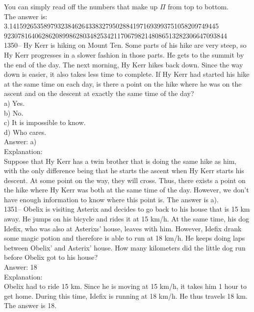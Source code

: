 \documentclass[letterpaper, 12pt]{article}
\begin{document}
You can simply read off the numbers that make up $\Pi$ from top to bottom.\\

The answer is:\\
3.1415926535897932384626433832795028841971693993751058209749445\\
92307816406286208998628034825342117067982148086513282306647093844\\

1350-- Hy Kerr is hiking on Mount Ten. Some parts of his hike are very steep, so Hy Kerr progresses in a slower fashion in those parts. He gets to the summit by the end of the day. The next morning, Hy Kerr hikes back down. Since the way down is easier, it also takes less time to complete. If Hy Kerr had started his hike at the same time on each day, is there a point on the hike where he was on the ascent and on the descent at exactly the same time of the day?\\
a) Yes.\\
b) No.\\
c) It is impossible to know.\\
d) Who cares.\\

Answer: a)\\

Explanation: \\
Suppose that Hy Kerr has a twin brother that is doing the same hike as him, with the only difference being that he starts the ascent when Hy Kerr starts his descent. At some point on the way, they will cross. Thus, there exists a point on the hike where Hy Kerr was both at the same time of the day. However, we don't have enough information to know where this point is. The answer is a).\\

1351-- Obelix is visiting Asterix and decides to go back to his house that is 15 km away. He jumps on his bicycle and rides it at 15 km/h. At the same time, his dog Idefix, who was also at Asterixs' house, leaves with him. However, Idefix drank some magic potion and therefore is able to run at 18 km/h. He keeps doing laps between Obelix' and Asterix' house. How many kilometers did the little dog run before Obelix got to his house?\\

Answer: 18\\

Explanation: \\
Obelix had to ride 15 km. Since he is moving at 15 km/h, it takes him 1 hour to get home. During this time, Idefix is running at 18 km/h. He thus travels 18 km. The answer is 18.\\
\end{document}
